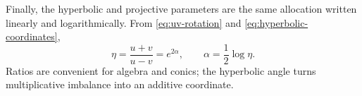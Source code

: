 

Finally, the hyperbolic and projective parameters are the same allocation
written linearly and logarithmically. From \cref{eq:uv-rotation} and
\cref{eq:hyperbolic-coordinates},
\begin{equation}
 \eta=\frac{u+v}{u-v}=e^{2\alpha},\qquad
 \alpha=\frac12\log\eta.
 \label{eq:eta-alpha}
\end{equation}
Ratios are convenient for algebra and conics; the hyperbolic angle turns
multiplicative imbalance into an additive coordinate.
